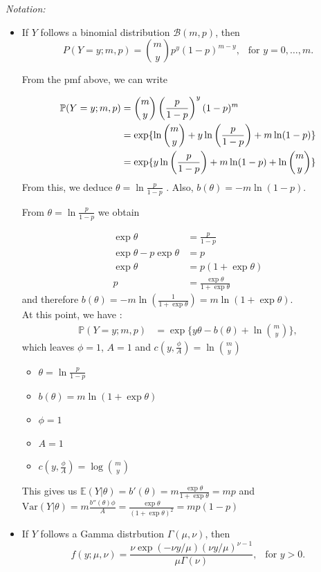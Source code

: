 \documentclass[a4paper,12pt]{article}
\def\op{\left(}
\def\cp{\right)}
\begin{document}
\textit{Notation:}
\begin{itemize}
\item If $Y$ follows a  binomial distribution ${\mathcal B}(m,p)$, then 
$$P(Y=y; m,p) = {m \choose y} p^{y} (1- p)^{m-y}, \ \  \mbox{ for } y=0, \ldots, m.$$

{\color{blue} 

From the pmf above, we can write

\begin{align*}
  \mathbb{P}(Y = y ; m, p) &= {m \choose y} \left(\frac{p}{1-p}\right)^{y} (1- p)^{m}\\
&=\exp\{\ln{m \choose y}+y\ln \left(\frac{p}{1-p}\right) + m\ln (1-p)\}\\
&= \exp\{y\ln \left(\frac{p}{1-p}\right) + m\ln (1-p) + \ln{m \choose y}\}  {\color{red}} 
\end{align*}
From this, we deduce $\theta = \ln \frac{p}{1-p}$ {\color{red}} . Also, $b(\theta) = - m \ln(1-p)$.


 From $\theta = \ln \frac{p}{1-p}$ we obtain

\begin{align*}
    \exp \theta&=\frac{p}{1-p}\\
    \exp\theta - p\exp\theta&=p\\
    \exp\theta&=p(1+\exp\theta)\\
    p&=\frac{\exp\theta}{1+\exp\theta} 
\end{align*}
and therefore $b(\theta)= - m  \ln (\frac{1}{1+\exp\theta}) = m \ln(1+\exp\theta)$. \\

At this point, we have :
\begin{align*}
  \mathbb{P}(Y = y ; m, p) &= \exp\{y\theta - b(\theta) + \ln{m \choose y}\},
\end{align*}
which leaves $\phi=1$, $A=1$ and $c(y, \frac{\phi}{A})= \ln{m \choose y}$
\begin{itemize}
  \item $\displaystyle \theta = \ln \frac{p}{1-p}$
  \item $\displaystyle b(\theta) = m\ln \op 1 + \exp \theta \cp$
  \item $\displaystyle \phi  = 1$ 
  \item $\displaystyle A = 1 $ 
  \item $\displaystyle c \op y , \frac{\phi}{A}\cp = \log { m \choose y}$ 
\end{itemize}

This gives us $\mathbb{E}(Y|\theta)=b'(\theta)=m\frac{\exp\theta}{1+\exp\theta}=mp$  and $\text{Var}(Y|\theta)=m\frac{b''(\theta)\phi}{A}=\frac{\exp\theta}{(1+\exp\theta)^2}=mp(1-p)$ 
}


\item If $Y$ follows a Gamma distrbution $\Gamma(\mu,\nu)$, then 
$$f(y;\mu,\nu)=\frac{\nu \exp(-\nu y/\mu)(\nu y/\mu)^{\nu-1}}{\mu\Gamma(\nu)}, \ \  \mbox{ for } y>0.$$
\end{itemize}
\end{document}
